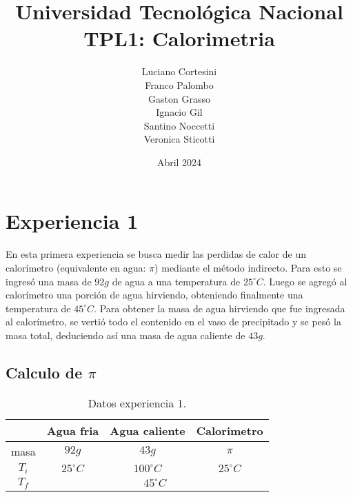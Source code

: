 \documentclass[12pt]{report}
\title{Universidad Tecnológica Nacional\\TPL1: Calorimetria}
\author{
Luciano Cortesini\\
Franco Palombo\\
Gaston Grasso\\
Ignacio Gil\\
Santino Noccetti\\
Veronica Sticotti
}
\date{Abril 2024}
\begin{document}
\maketitle

\section{Experiencia 1}
En esta primera experiencia se busca medir las perdidas de calor de un calorímetro (equivalente en agua: $\pi$) mediante el método indirecto. 
Para esto se ingresó una masa de $92g$ de agua a una temperatura de $25^\circ C$.
Luego se agregó al calorímetro una porción de agua hirviendo, obteniendo finalmente una temperatura de  $45^\circ C$. 
Para obtener la masa de agua hirviendo que fue ingresada al calorímetro, se vertió todo el contenido en el vaso de precipitado y se pesó la masa total, deduciendo así una masa de agua caliente de $43g$.
\subsection{Calculo de $\pi$}
\begin{table}[htbp]
    \centering
    \begin{tabular}{|c|c|c|c|}
    \hline
    & Agua fria & Agua caliente & Calorimetro\\
    \hline
    masa & $92g$ & $43g$ & $\pi$ \\
    \hline
   $T_i$ & $25^\circ C$ & $100^\circ C$ & $25^\circ C$\\
    \hline
     $T_f$ & \multicolumn{3}{|c|}{$45^\circ C$}\\
    \hline
    \end{tabular}
    \caption{Datos experiencia 1.}
    \label{tab:datos experiencia 1}
\end{table}
\end{document}
